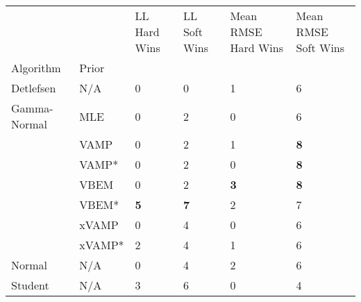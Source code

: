 \begin{tabular}{llllll}
\toprule
        &     & LL Hard Wins & LL Soft Wins & Mean RMSE Hard Wins & Mean RMSE Soft Wins \\
Algorithm & Prior &              &              &                     &                     \\
\midrule
Detlefsen & N/A &            0 &            0 &                   1 &                   6 \\
Gamma-Normal & MLE &            0 &            2 &                   0 &                   6 \\
        & VAMP &            0 &            2 &                   1 &          \textbf{8} \\
        & VAMP* &            0 &            2 &                   0 &          \textbf{8} \\
        & VBEM &            0 &            2 &          \textbf{3} &          \textbf{8} \\
        & VBEM* &   \textbf{5} &   \textbf{7} &                   2 &                   7 \\
        & xVAMP &            0 &            4 &                   0 &                   6 \\
        & xVAMP* &            2 &            4 &                   1 &                   6 \\
Normal & N/A &            0 &            4 &                   2 &                   6 \\
Student & N/A &            3 &            6 &                   0 &                   4 \\
\bottomrule
\end{tabular}


